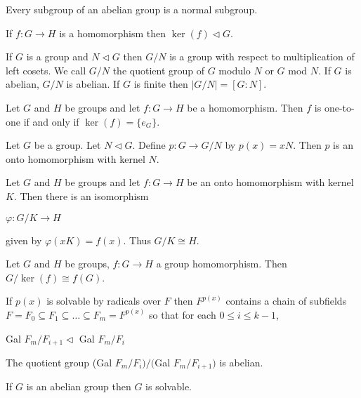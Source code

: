 \documentclass{article}
\begin{document}

Every subgroup of an abelian group is a normal subgroup.


If $f:G \to H$ is a homomorphism then $\ker(f)\lhd G$.


If $G$ is a group and $N \lhd G$ then $G/N$ is a group with respect to multiplication of left cosets. We call $G/N$ the quotient group of $G$ modulo $N$ or $G$ mod $N$. If $G$ is abelian, $G/N$ is abelian. If $G$ is finite then $|G/N|=[G:N]$.

\newpage
{}

Let $G$ and $H$ be groups and let $f:G\to H$ be a homomorphism. Then $f$ is one-to-one if and only if $\ker(f)=\{e_G\}$.


Let $G$ be a group. Let $N \lhd G$. Define $p:G\to G/N$ by $p(x)=xN$. Then $p$ is an onto homomorphism with kernel $N$.


Let $G$ and $H$ be groups and let $f:G \to H$ be an onto homomorphism with kernel $K$. Then there is an isomorphism

$\varphi: G/K\to H$

given by $\varphi(xK) = f(x)$. Thus $G/K \cong H$.


Let $G$ and $H$ be groups, $f: G \to H$ a group homomorphism. Then $G/\ker(f)\cong f(G)$.

\newpage
{}

If $p(x)$ is solvable by radicals over $F$ then $F^{p(x)}$ contains a chain of subfields $F=F_0\subseteq F_1 \subseteq \hdots \subseteq F_m = F^{p(x)}$ so that for each $0 \leq i \leq k-1$, 

\indent\indent Gal $F_m/F_{i+1} \lhd$ Gal $F_m/F_i$

\indent\indent The quotient group (Gal $F_m/F_i) / ($Gal $F_m/F_{i+1})$ is abelian.

\newpage


If $G$ is an abelian group then $G$ is solvable.

\end{document}
